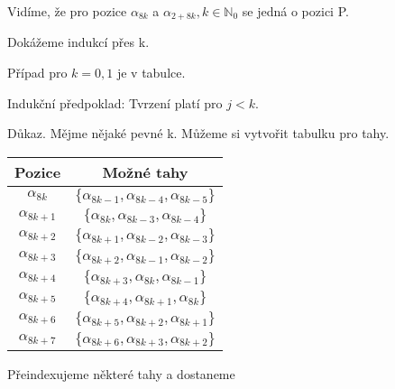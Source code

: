 \documentclass[../main.tex]{subfiles}
\begin{document}
Vidíme, že pro pozice $\alpha_{8k}$ a $\alpha_{2+8k}, k\in\mathbb{N}_0$ se jedná o pozici P. 

Dokážeme indukcí přes k.

Případ pro $k=0,1$ je v tabulce. 

Indukční předpoklad: 
Tvrzení platí pro $j<k$.

Důkaz. Mějme nějaké pevné k. Můžeme si vytvořit tabulku pro tahy.

\begin{center}
    \begin{tabular}{|c|c|}
        \hline
        Pozice & Možné tahy \\
        \hline
        $\alpha_{8k}$  & $\{ \alpha_{8k-1},  \alpha_{8k-4}, \alpha_{8k-5} \}$ \\
        \hline
        $\alpha_{8k+1}$  & $\{ \alpha_{8k},  \alpha_{8k-3}, \alpha_{8k-4} \}$ \\
        \hline
        $\alpha_{8k+2}$  & $\{ \alpha_{8k+1},  \alpha_{8k-2}, \alpha_{8k-3} \}$ \\
        \hline
        $\alpha_{8k+3}$  & $\{ \alpha_{8k+2},  \alpha_{8k-1}, \alpha_{8k-2} \}$ \\
        \hline
        $\alpha_{8k+4}$  & $\{ \alpha_{8k+3},  \alpha_{8k}, \alpha_{8k-1} \}$ \\
        \hline
        $\alpha_{8k+5}$  & $\{ \alpha_{8k+4},  \alpha_{8k+1}, \alpha_{8k} \}$ \\
        \hline
        $\alpha_{8k+6}$  & $\{ \alpha_{8k+5},  \alpha_{8k+2}, \alpha_{8k+1} \}$ \\
        \hline
        $\alpha_{8k+7}$ & $\{ \alpha_{8k+6},  \alpha_{8k+3}, \alpha_{8k+2} \}$ \\
        \hline
    \end{tabular}

\end{center}


Přeindexujeme některé tahy a dostaneme
\end{document}
